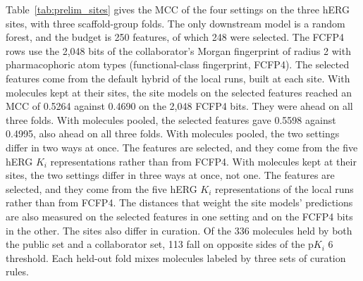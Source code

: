 Table~\ref{tab:prelim_sites} gives the MCC of the four settings on the three hERG sites, with three scaffold-group folds. The only downstream model is a random forest, and the budget is 250 features, of which 248 were selected. The FCFP4 rows use the 2,048 bits of the collaborator's Morgan fingerprint of radius 2 with pharmacophoric atom types (functional-class fingerprint, FCFP4). The selected features come from the default hybrid of the local runs, built at each site. With molecules kept at their sites, the site models on the selected features reached an MCC of 0.5264 against 0.4690 on the 2,048 FCFP4 bits. They were ahead on all three folds. With molecules pooled, the selected features gave 0.5598 against 0.4995, also ahead on all three folds. With molecules pooled, the two settings differ in two ways at once. The features are selected, and they come from the five hERG $K_i$ representations rather than from FCFP4. With molecules kept at their sites, the two settings differ in three ways at once, not one. The features are selected, and they come from the five hERG $K_i$ representations of the local runs rather than from FCFP4. The distances that weight the site models' predictions are also measured on the selected features in one setting and on the FCFP4 bits in the other. The sites also differ in curation. Of the 336 molecules held by both the public set and a collaborator set, 113 fall on opposite sides of the p$K_i$ 6 threshold. Each held-out fold mixes molecules labeled by three sets of curation rules.

